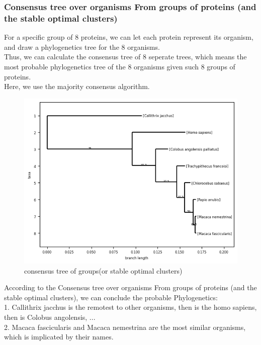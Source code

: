 \documentclass[a4paper, 12pt, one column]{article}
\begin{document}
\subsubsection{Consensus tree over organisms From groups of proteins (and the stable optimal clusters)}
For a specific group of 8 proteins, we can let each protein represent its organism, and draw a phylogenetics tree for the 8 organisms. \\
Thus, we can calculate the consensus tree of 8 seperate trees, which means the most probable phylogenetics tree of the 8 organisms given such 8 groups of proteins.\\
Here, we use the majority consensus algorithm.\\
\begin{figure}[H]
    \centering
    \includegraphics[width=.8\linewidth]{concensus_tree_of_groups.png}
    \caption{consensus tree of groups(or stable optimal clusters)}
    \label{fig:concensus_tree_of_groups.png}
\end{figure}  
According to the Consensus tree over organisms From groups of proteins (and the stable optimal clusters), we can conclude the probable Phylogenetics:\\
1. Callithrix jacchus is the remotest to other organisms, then is the homo sapiens, then is Colobus angolensis, ...  \\ 
2. Macaca fascicularis and Macaca nemestrina are the most similar organisms, which is implicated by their names. \\
\end{document}

